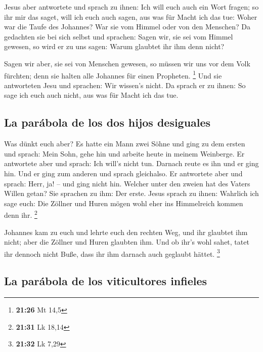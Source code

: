  Jesus aber antwortete und sprach zu ihnen: Ich will euch
auch ein Wort fragen; so ihr mir das saget, will ich euch auch sagen,
aus was für Macht ich das tue:  Woher war die Taufe des
Johannes? War sie vom Himmel oder von den Menschen? Da gedachten sie bei
sich selbst und sprachen: Sagen wir, sie sei vom Himmel gewesen, so wird
er zu uns sagen: Warum glaubtet ihr ihm denn nicht?

 Sagen wir aber, sie sei von Menschen gewesen, so müssen
wir uns vor dem Volk fürchten; denn sie halten alle Johannes für einen
Propheten. \footnote{\textbf{21:26} Mt 14,5}  Und sie
antworteten Jesu und sprachen: Wir wissen's nicht. Da sprach er zu
ihnen: So sage ich euch auch nicht, aus was für Macht ich das tue.

\hypertarget{la-paruxe1bola-de-los-dos-hijos-desiguales}{%
\subsection{La parábola de los dos hijos
desiguales}\label{la-paruxe1bola-de-los-dos-hijos-desiguales}}

 Was dünkt euch aber? Es hatte ein Mann zwei Söhne und
ging zu dem ersten und sprach: Mein Sohn, gehe hin und arbeite heute in
meinem Weinberge.  Er antwortete aber und sprach: Ich
will's nicht tun. Darnach reute es ihn und er ging hin. 
Und er ging zum anderen und sprach gleichalso. Er antwortete aber und
sprach: Herr, ja! -- und ging nicht hin.  Welcher unter
den zweien hat des Vaters Willen getan? Sie sprachen zu ihm: Der erste.
Jesus sprach zu ihnen: Wahrlich ich sage euch: Die Zöllner und Huren
mögen wohl eher ins Himmelreich kommen denn ihr. \footnote{\textbf{21:31}
  Lk 18,14}

 Johannes kam zu euch und lehrte euch den rechten Weg,
und ihr glaubtet ihm nicht; aber die Zöllner und Huren glaubten ihm. Und
ob ihr's wohl sahet, tatet ihr dennoch nicht Buße, dass ihr ihm darnach
auch geglaubt hättet. \footnote{\textbf{21:32} Lk 7,29}

\hypertarget{la-paruxe1bola-de-los-viticultores-infieles}{%
\subsection{La parábola de los viticultores
infieles}\label{la-paruxe1bola-de-los-viticultores-infieles}}

